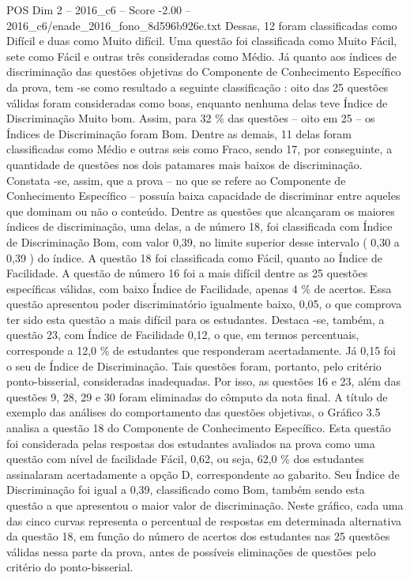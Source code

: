 \begin{textsample}{POS Dim 2 – 2016\_c6 – Score -2.00 – 2016\_c6/enade\_2016\_fono\_8d596b926e.txt}
Dessas, 12 foram classificadas como Difícil e duas como Muito difícil.
Uma questão foi classificada como Muito Fácil, sete como Fácil e outras três consideradas como Médio.
Já quanto aos índices de discriminação das questões objetivas do Componente de Conhecimento Específico da prova, tem -se como resultado a seguinte classificação : oito das 25 questões válidas foram consideradas como boas, enquanto nenhuma delas teve Índice de Discriminação Muito bom.
Assim, para 32 \% das questões – oito em 25 – os Índices de Discriminação foram Bom.
Dentre as demais, 11 delas foram classificadas como Médio e outras seis como Fraco, sendo 17, por conseguinte, a quantidade de questões nos dois patamares mais baixos de discriminação.
Constata -se, assim, que a prova – no que se refere ao Componente de Conhecimento Específico – possuía baixa capacidade de discriminar entre aqueles que dominam ou não o conteúdo.
Dentre as questões que alcançaram os maiores índices de discriminação, uma delas, a de número 18, foi classificada com Índice de Discriminação Bom, com valor 0,39, no limite superior desse intervalo ( 0,30 a 0,39 ) do índice.
A questão 18 foi classificada como Fácil, quanto ao Índice de Facilidade.
A questão de número 16 foi a mais difícil dentre as 25 questões específicas válidas, com baixo Índice de Facilidade, apenas 4 \% de acertos.
Essa questão apresentou poder discriminatório igualmente baixo, 0,05, o que comprova ter sido esta questão a mais difícil para os estudantes.
Destaca -se, também, a questão 23, com Índice de Facilidade 0,12, o que, em termos percentuais, corresponde a 12,0 \% de estudantes que responderam acertadamente.
Já 0,15 foi o seu de Índice de Discriminação.
Tais questões foram, portanto, pelo critério ponto-bisserial, consideradas inadequadas.
Por isso, as questões 16 e 23, além das questões 9, 28, 29 e 30 foram eliminadas do cômputo da nota final.
A título de exemplo das análises do comportamento das questões objetivas, o Gráfico 3.5 analisa a questão 18 do Componente de Conhecimento Específico.
Esta questão foi considerada pelas respostas dos estudantes avaliados na prova como uma questão com nível de facilidade Fácil, 0,62, ou seja, 62,0 \% dos estudantes assinalaram acertadamente a opção D, correspondente ao gabarito.
Seu Índice de Discriminação foi igual a 0,39, classificado como Bom, também sendo esta questão a que apresentou o maior valor de discriminação.
Neste gráfico, cada uma das cinco curvas representa o percentual de respostas em determinada alternativa da questão 18, em função do número de acertos dos estudantes nas 25 questões válidas nessa parte da prova, antes de possíveis eliminações de questões pelo critério do ponto-bisserial.

\end{textsample}
